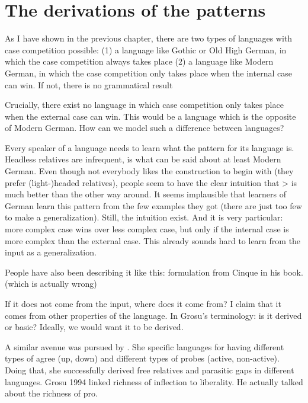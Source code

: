 
\chapter{The derivations of the patterns}\label{ch:relativization}

As I have shown in the previous chapter, there are two types of languages with case competition possible:
(1) a language like Gothic or Old High German, in which the case competition always takes place
(2) a language like Modern German, in which the case competition only takes place when the internal case can win. If not, there is no grammatical result

Crucially, there exist no language in which case competition only takes place when the external case can win. This would be a language which is the opposite of Modern German. How can we model such a difference between languages?

Every speaker of a language needs to learn what the pattern for its language is. Headless relatives are infrequent, is what can be said about at least Modern German. Even though not everybody likes the construction to begin with (they prefer (light-)headed relatives), people seem to have the clear intuition that > is much better than the other way around. It seems implausible that learners of German learn this pattern from the few examples they got (there are just too few to make a generalization). Still, the intuition exist. And it is very particular: more complex case wins over less complex case, but only if the internal case is more complex than the external case. This already sounds hard to learn from the input as a generalization.

People have also been describing it like this: formulation from Cinque in his book. (which is actually wrong)

If it does not come from the input, where does it come from? I claim that it comes from other properties of the language. In Grosu's terminology: is it derived or basic? Ideally, we would want it to be derived.

A similar avenue was pursued by \citealt{himmelreich2017}. She specific languages for having different types of agree (up, down) and different types of probes (active, non-active). Doing that, she successfully derived free relatives and parasitic gaps in different languages. Grosu 1994 linked richness of inflection to liberality. He actually talked about the richness of pro.

